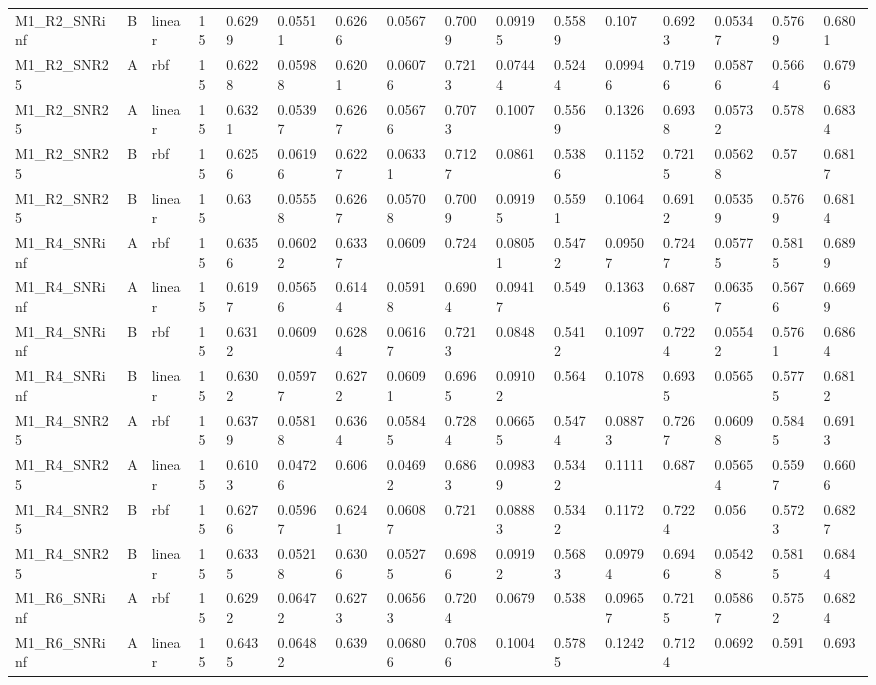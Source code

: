 \begin{tabular}{llllllllllllllll}
M1\_R2\_SNRinf & B & linear & 15 & 0.6299 & 0.05511 & 0.6266 & 0.0567 & 0.7009 & 0.09195 & 0.5589 & 0.107 & 0.6923 & 0.05347 & 0.5769 & 0.6801 \\
M1\_R2\_SNR25 & A & rbf & 15 & 0.6228 & 0.05988 & 0.6201 & 0.06076 & 0.7213 & 0.07444 & 0.5244 & 0.09946 & 0.7196 & 0.05876 & 0.5664 & 0.6796 \\
M1\_R2\_SNR25 & A & linear & 15 & 0.6321 & 0.05397 & 0.6267 & 0.05676 & 0.7073 & 0.1007 & 0.5569 & 0.1326 & 0.6938 & 0.05732 & 0.578 & 0.6834 \\
M1\_R2\_SNR25 & B & rbf & 15 & 0.6256 & 0.06196 & 0.6227 & 0.06331 & 0.7127 & 0.0861 & 0.5386 & 0.1152 & 0.7215 & 0.05628 & 0.57 & 0.6817 \\
M1\_R2\_SNR25 & B & linear & 15 & 0.63 & 0.05558 & 0.6267 & 0.05708 & 0.7009 & 0.09195 & 0.5591 & 0.1064 & 0.6912 & 0.05359 & 0.5769 & 0.6814 \\
M1\_R4\_SNRinf & A & rbf & 15 & 0.6356 & 0.06022 & 0.6337 & 0.0609 & 0.724 & 0.08051 & 0.5472 & 0.09507 & 0.7247 & 0.05775 & 0.5815 & 0.6899 \\
M1\_R4\_SNRinf & A & linear & 15 & 0.6197 & 0.05656 & 0.6144 & 0.05918 & 0.6904 & 0.09417 & 0.549 & 0.1363 & 0.6876 & 0.06357 & 0.5676 & 0.6699 \\
M1\_R4\_SNRinf & B & rbf & 15 & 0.6312 & 0.0609 & 0.6284 & 0.06167 & 0.7213 & 0.0848 & 0.5412 & 0.1097 & 0.7224 & 0.05542 & 0.5761 & 0.6864 \\
M1\_R4\_SNRinf & B & linear & 15 & 0.6302 & 0.05977 & 0.6272 & 0.06091 & 0.6965 & 0.09102 & 0.564 & 0.1078 & 0.6935 & 0.0565 & 0.5775 & 0.6812 \\
M1\_R4\_SNR25 & A & rbf & 15 & 0.6379 & 0.05818 & 0.6364 & 0.05845 & 0.7284 & 0.06655 & 0.5474 & 0.08873 & 0.7267 & 0.06098 & 0.5845 & 0.6913 \\
M1\_R4\_SNR25 & A & linear & 15 & 0.6103 & 0.04726 & 0.606 & 0.04692 & 0.6863 & 0.09839 & 0.5342 & 0.1111 & 0.687 & 0.05654 & 0.5597 & 0.6606 \\
M1\_R4\_SNR25 & B & rbf & 15 & 0.6276 & 0.05967 & 0.6241 & 0.06087 & 0.721 & 0.08883 & 0.5342 & 0.1172 & 0.7224 & 0.056 & 0.5723 & 0.6827 \\
M1\_R4\_SNR25 & B & linear & 15 & 0.6335 & 0.05218 & 0.6306 & 0.05275 & 0.6986 & 0.09192 & 0.5683 & 0.09794 & 0.6946 & 0.05428 & 0.5815 & 0.6844 \\
M1\_R6\_SNRinf & A & rbf & 15 & 0.6292 & 0.06472 & 0.6273 & 0.06563 & 0.7204 & 0.0679 & 0.538 & 0.09657 & 0.7215 & 0.05867 & 0.5752 & 0.6824 \\
M1\_R6\_SNRinf & A & linear & 15 & 0.6435 & 0.06482 & 0.639 & 0.06806 & 0.7086 & 0.1004 & 0.5785 & 0.1242 & 0.7124 & 0.0692 & 0.591 & 0.693 \\

\end{tabular}
